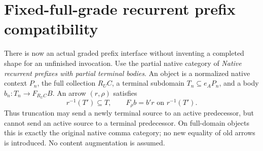 \documentclass[11pt]{article}
\begin{document}
\section{Fixed-full-grade recurrent prefix compatibility}
There is now an actual graded prefix interface without inventing a completed shape for an unfinished invocation. Use the partial native category of \emph{Native recurrent prefixes with partial terminal bodies}. An object is a normalized native context $P_n$, the full collection $R_UC$, a terminal subdomain $T_n\subseteq e_AP_n$, and a body $b_n:T_n\to F_{R_UC}B$. An arrow $(r,\rho)$ satisfies
\[
 r^{-1}(T')\subseteq T,\qquad F_\rho b=b'r\text{ on }r^{-1}(T').       \tag{7}
\]
Thus truncation may send a newly terminal source to an active predecessor, but cannot send an active source to a terminal predecessor. On full-domain objects this is exactly the original native comma category; no new equality of old arrows is introduced. No content augmentation is assumed.
\end{document}
